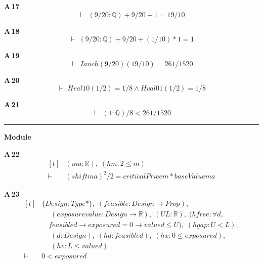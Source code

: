 \noindent\textbf{A\,17}\quad{}
{\footnotesize\[ \vdash\; (9/20 : \mathbb{Q} ) + 9/20 + 1 = 19/10 \]}

\noindent\textbf{A\,18}\quad{}
{\footnotesize\[ \vdash\; (9/20 : \mathbb{Q} ) + 9/20 + (1/10) * 1 = 1 \]}

\noindent\textbf{A\,19}\quad{}
{\footnotesize\[ \vdash\; \mathit{Ianch} (9/20) (19/10) = 261 / 1520 \]}

\noindent\textbf{A\,20}\quad{}
{\footnotesize\[ \vdash\; \mathit{Hval} 1 0 (1/2) = 1 / 8 \wedge \mathit{Hval} 0 1 (1/2) = 1 / 8 \]}

\noindent\textbf{A\,21}\quad{}
{\footnotesize\[ \vdash\; (1 : \mathbb{Q} ) / 8 < 261 / 1520 \]}

\vspace{4pt}\noindent\rule{\columnwidth}{0.4pt}\par\vspace{2pt}
\noindent\textbf{Module }\par\vspace{3pt}

\noindent\textbf{A\,22}\quad{}
{\footnotesize\[ \begin{aligned}[t]
&(\mathit{m} \mathit{a} : \mathbb{R} ),\; (\mathit{hm} : 2 \leq \mathit{m})\\
\vdash\;&(\mathit{shift} \mathit{m} \mathit{a})^{2}/2 = \mathit{criticalPrice} \mathit{m} * \mathit{baseValue} \mathit{m} \mathit{a}
\end{aligned} \]}

\noindent\textbf{A\,23}\quad{}
{\footnotesize\[ \begin{aligned}[t]
&\{ \mathit{Design} : \mathit{Type}*\},\; (\mathit{feasible} : \mathit{Design} \to \mathit{Prop}),\\
&\quad \; (\mathit{exposure} \mathit{value} : \mathit{Design} \to \mathbb{R} ),\; (\mathit{U} \mathit{L} : \mathbb{R} ),\; (\mathit{hfree} : \forall \mathit{d},\\
&\quad \mathit{feasible} \mathit{d} \to \mathit{exposure} \mathit{d} = 0 \to \mathit{value} \mathit{d} \leq \mathit{U}),\; (\mathit{hgap} : \mathit{U} < \mathit{L}),\\
&\quad \; (\mathit{d} : \mathit{Design}),\; (\mathit{hd} : \mathit{feasible} \mathit{d}),\; (\mathit{hx} : 0 \leq \mathit{exposure} \mathit{d}),\\
&\quad \; (\mathit{hv} : \mathit{L} \leq \mathit{value} \mathit{d})\\
\vdash\;&0 < \mathit{exposure} \mathit{d}
\end{aligned} \]}


